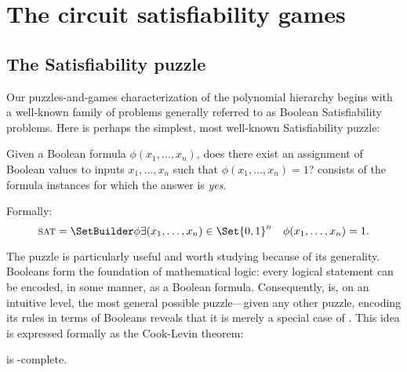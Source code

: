 \section{The circuit satisfiability games}


\subsection{The Satisfiability puzzle}


Our puzzles-and-games characterization of the polynomial hierarchy begins with
a well-known family of problems generally referred to as Boolean Satisfiability
problems.  Here is perhaps the simplest, most well-known Satisfiability puzzle:

\begin{definition}[\SAT]%
  Given a Boolean formula \(\phi(x_1, \dots, x_n)\), does there exist an
  assignment of Boolean values to inputs \(x_1, \dots, x_n\) such that
  \(\phi(x_1, \dots, x_n) = 1\)?   consists of the formula
  instances for which the answer is \emph{yes}.

  Formally:
  \[
    \Problem{sat} = \SetBuilder \phi {
      \exists (x_1, \dots, x_n) \in \Set{0,1}^n \quad \phi(x_1, \dots, x_n) = 1
    }.
  \]
\end{definition}

The \SAT{} puzzle is particularly useful and worth studying because of its
generality.  Booleans form the foundation of mathematical logic: every logical
statement can be encoded, in some manner, as a Boolean formula.  Consequently,
\SAT{} is, on an intuitive level, the most general possible puzzle---given any
other puzzle, encoding its rules in terms of Booleans reveals that it is merely
a special case of \SAT.  This idea is expressed formally as the Cook-Levin
theorem:

\begin{theorem}
  \SAT{} is \NP-complete.
\end{theorem}


